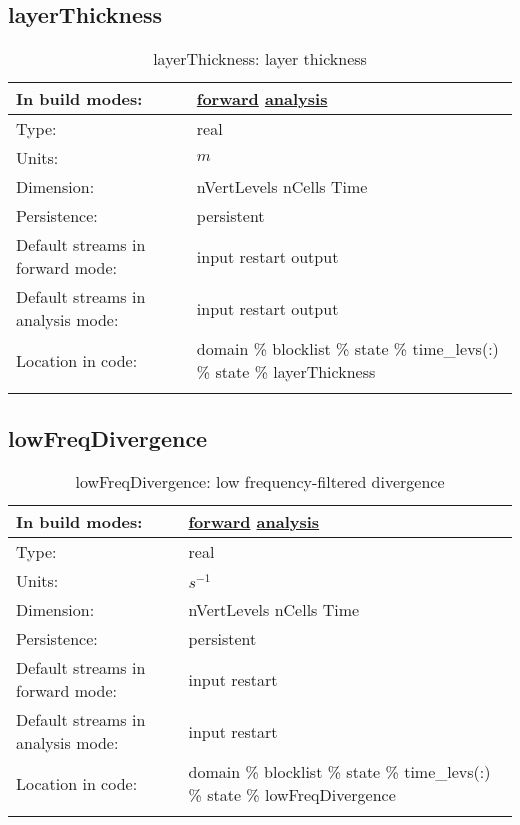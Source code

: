 \subsection[layerThickness]{layerThickness}
\label{subsec:var_sec_state_layerThickness}
\begin{center}
\begin{longtable}{| p{2.0in} | p{4.0in} |}
        \hline 
        In build modes: & \hyperref[subsec:forward_var_tab_state]{forward} \hyperref[subsec:analysis_var_tab_state]{analysis} \\
        \hline 
        Type: & real \\
        \hline 
        Units: & $m$ \\
        \hline 
        Dimension: & nVertLevels nCells Time \\
        \hline 
        Persistence: & persistent \\
        \hline 
		 Default streams in forward mode: &  input restart output \\
        \hline 
		 Default streams in analysis mode: &  input restart output \\
        \hline 
		 Location in code: & domain \% blocklist \% state \% time\_levs(:) \% state \% layerThickness \\
		 \hline 
    \caption{layerThickness: layer thickness}
\end{longtable}
\end{center}
\subsection[lowFreqDivergence]{lowFreqDivergence}
\label{subsec:var_sec_state_lowFreqDivergence}
\begin{center}
\begin{longtable}{| p{2.0in} | p{4.0in} |}
        \hline 
        In build modes: & \hyperref[subsec:forward_var_tab_state]{forward} \hyperref[subsec:analysis_var_tab_state]{analysis} \\
        \hline 
        Type: & real \\
        \hline 
        Units: & $s^{-1}$ \\
        \hline 
        Dimension: & nVertLevels nCells Time \\
        \hline 
        Persistence: & persistent \\
        \hline 
		 Default streams in forward mode: &  input restart \\
        \hline 
		 Default streams in analysis mode: &  input restart \\
        \hline 
		 Location in code: & domain \% blocklist \% state \% time\_levs(:) \% state \% lowFreqDivergence \\
		 \hline 
    \caption{lowFreqDivergence: low frequency-filtered divergence}
\end{longtable}
\end{center}
